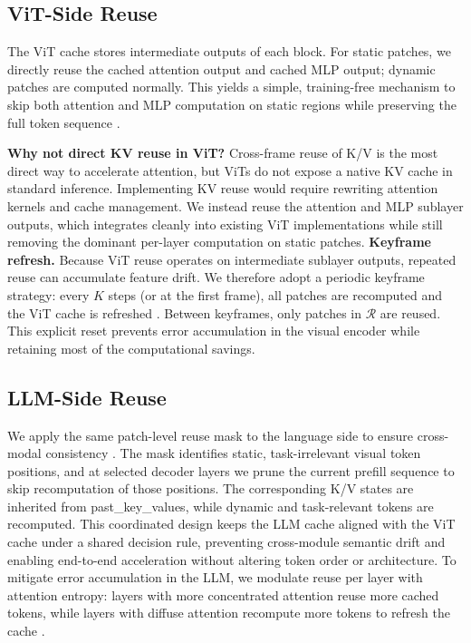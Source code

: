 \documentclass[11pt]{article}
\begin{document}
\subsection{ViT-Side Reuse}
The ViT cache stores intermediate outputs of each block. For static patches, we directly reuse the cached attention output and cached MLP output; dynamic patches are computed normally. This yields a simple, training-free mechanism to skip both attention and MLP computation on static regions while preserving the full token sequence \citep{liu2025ttf}.

\textbf{Why not direct KV reuse in ViT?} Cross-frame reuse of K/V is the most direct way to accelerate attention, but ViTs do not expose a native KV cache in standard inference. Implementing KV reuse would require rewriting attention kernels and cache management. We instead reuse the attention and MLP sublayer outputs, which integrates cleanly into existing ViT implementations while still removing the dominant per-layer computation on static patches.
\textbf{Keyframe refresh.} Because ViT reuse operates on intermediate sublayer outputs, repeated reuse can accumulate feature drift. We therefore adopt a periodic keyframe strategy: every $K$ steps (or at the first frame), all patches are recomputed and the ViT cache is refreshed \citep{liu2025ttf}. Between keyframes, only patches in $\mathcal{R}$ are reused. This explicit reset prevents error accumulation in the visual encoder while retaining most of the computational savings.
\subsection{LLM-Side Reuse}
We apply the same patch-level reuse mask to the language side to ensure cross-modal consistency \citep{xu2025vla}. The mask identifies static, task-irrelevant visual token positions, and at selected decoder layers we prune the current prefill sequence to skip recomputation of those positions. The corresponding K/V states are inherited from past\_key\_values, while dynamic and task-relevant tokens are recomputed. This coordinated design keeps the LLM cache aligned with the ViT cache under a shared decision rule, preventing cross-module semantic drift and enabling end-to-end acceleration without altering token order or architecture. To mitigate error accumulation in the LLM, we modulate reuse per layer with attention entropy: layers with more concentrated attention reuse more cached tokens, while layers with diffuse attention recompute more tokens to refresh the cache \citep{xu2025vla}.
\end{document}
